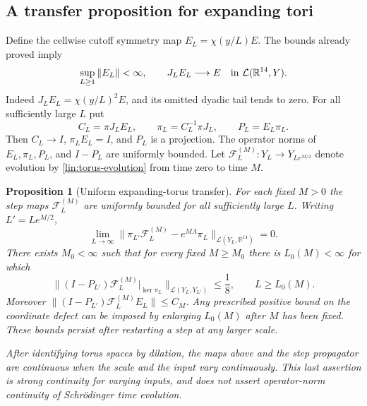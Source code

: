 \documentclass[11pt]{article}
\numberwithin{equation}{section}
\newtheorem{proposition}[theorem]{Proposition}
\theoremstyle{definition}
\theoremstyle{remark}
\begin{document}
\subsection{A transfer proposition for expanding tori}

Define the cellwise cutoff symmetry map $E_L=\chi(y/L)E$.
The bounds already proved imply
\begin{equation}\label{lin:EL-convergence}
 \sup_{L\ge1}\|E_L\|<\infty,\qquad J_LE_L\longrightarrow E
       \quad\hbox{in }\mathcal L(\mathbb R^{14},Y).
\end{equation}
Indeed $J_LE_L=\chi(y/L)^2E$, and its omitted dyadic tail tends to
zero.  For all sufficiently large $L$ put
\begin{equation}\label{lin:piL}
 C_L=\pi J_LE_L,\qquad
 \pi_L=C_L^{-1}\pi J_L,\qquad P_L=E_L\pi_L.
\end{equation}
Then $C_L\to I$, $\pi_LE_L=I$, and $P_L$ is a projection.  The
operator norms of $E_L,\pi_L,P_L$, and $I-P_L$ are uniformly bounded.
Let $\mathcal F_L^{(M)}:Y_L\to Y_{Le^{M/2}}$ denote evolution by
\eqref{lin:torus-evolution} from time zero to time $M$.

\begin{proposition}[Uniform expanding-torus transfer]\label{linear:torus}
For each fixed $M>0$ the step maps $\mathcal F_L^{(M)}$ are uniformly
bounded for all sufficiently large $L$.  Writing $L'=Le^{M/2}$,
\begin{equation}\label{lin:coordinate-defect}
 \lim_{L\to\infty}
 \|\pi_{L'}\mathcal F_L^{(M)}-e^{M\Lambda}\pi_L\|
 _{\mathcal L(Y_L,\mathbb R^{14})}=0.
\end{equation}
There exists $M_0<\infty$ such that for every fixed $M\ge M_0$
there is $L_0(M)<\infty$ for which
\begin{equation}\label{lin:torus-stable-contraction}
 \|(I-P_{L'})\mathcal F_L^{(M)}|_{\ker\pi_L}\|
       _{\mathcal L(Y_L,Y_{L'})}\le\frac18,
 \qquad L\ge L_0(M).
\end{equation}
Moreover $\|(I-P_{L'})\mathcal F_L^{(M)}E_L\|\le C_M$.
Any prescribed positive bound on the coordinate defect can be imposed
by enlarging $L_0(M)$ after $M$ has been fixed.  These bounds persist
after restarting a step at any larger scale.

After identifying torus spaces by dilation, the maps above and the
step propagator are continuous when the scale and the input vary
continuously.  This last assertion is strong continuity for varying
inputs, and does not assert operator-norm continuity of Schr\"odinger
time evolution.
\end{proposition}
\end{document}
